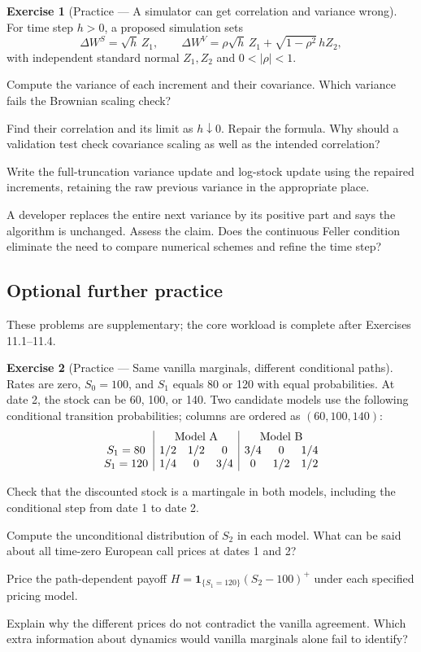\documentclass[11pt]{article}
\theoremstyle{definition}
\newtheorem{exercise}{Exercise}[section]
\begin{document}
\begin{exercise}[Practice --- A simulator can get correlation and variance wrong]
For time step \(h>0\), a proposed simulation sets
\[
\Delta W^S=\sqrt h\,Z_1,\qquad
\Delta W^V=\rho\sqrt h\,Z_1+\sqrt{1-\rho^2}\,hZ_2,
\]
with independent standard normal \(Z_1,Z_2\) and \(0<|\rho|<1\).
\begin{exparts}
\item Compute the variance of each increment and their covariance. Which variance fails the Brownian scaling check?
\item Find their correlation and its limit as \(h\downarrow0\). Repair the formula. Why should a validation test check covariance scaling as well as the intended correlation?
\item Write the full-truncation variance update and log-stock update using the repaired increments, retaining the raw previous variance in the appropriate place.
\item A developer replaces the entire next variance by its positive part and says the algorithm is unchanged. Assess the claim. Does the continuous Feller condition eliminate the need to compare numerical schemes and refine the time step?
\end{exparts}
\end{exercise}
\fi

\ifIncludeFurther
{}
\subsection*{Optional further practice}
\noindent These problems are supplementary; the core workload is complete after Exercises 11.1--11.4.
\setcounter{exercise}{4}
\begin{exercise}[Practice --- Same vanilla marginals, different conditional paths]
Rates are zero, \(S_0=100\), and \(S_1\) equals 80 or 120 with equal
probabilities. At date 2, the stock can be 60, 100, or 140. Two candidate
models use the following conditional transition probabilities; columns are
ordered as \((60,100,140)\):
\[
\begin{array}{c|ccc|ccc}
&\multicolumn{3}{c|}{\text{Model A}}&\multicolumn{3}{c}{\text{Model B}}\\
S_1=80&1/2&1/2&0&3/4&0&1/4\\
S_1=120&1/4&0&3/4&0&1/2&1/2
\end{array}
\]
\begin{exparts}
\item Check that the discounted stock is a martingale in both models, including the conditional step from date 1 to date 2.
\item Compute the unconditional distribution of \(S_2\) in each model. What can be said about all time-zero European call prices at dates 1 and 2?
\item Price the path-dependent payoff \(H=\mathbf1_{\{S_1=120\}}(S_2-100)^+\) under each specified pricing model.
\item Explain why the different prices do not contradict the vanilla agreement. Which extra information about dynamics would vanilla marginals alone fail to identify?
\end{exparts}
\end{exercise}
\end{document}
